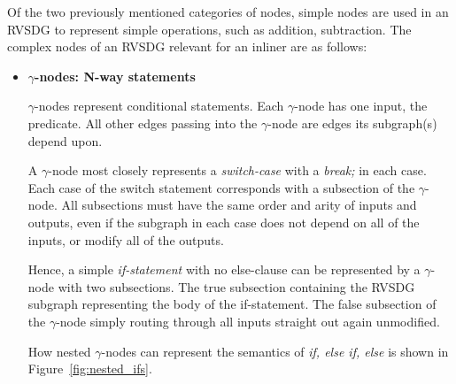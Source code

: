 Of the two previously mentioned categories of nodes, simple nodes are used in an
RVSDG to represent simple operations, such as addition, subtraction. The complex
nodes of an RVSDG relevant for an inliner are as follows:

\begin{itemize}

\item \textbf{$\gamma$-nodes: N-way statements}

\textit{$\gamma$}-nodes represent conditional statements. Each $\gamma$-node has
one input, the predicate. All other edges passing into the $\gamma$-node are
edges its subgraph(s) depend upon.

A $\gamma$-node most closely represents a \textit{switch-case} with a \textit{break;} in
each case. Each case of the switch statement corresponds with a subsection of
the $\gamma$-node. All subsections must have the same order and arity of inputs
and outputs, even if the subgraph in each case does not depend on all of the
inputs, or modify all of the outputs.

Hence, a simple \textit{if-statement} with no else-clause can be represented by
a $\gamma$-node with two subsections. The true subsection containing the RVSDG
subgraph representing the body of the if-statement. The false subsection of the
$\gamma$-node simply routing through all inputs straight out again unmodified.

How nested $\gamma$-nodes can represent the semantics of \textit{if, else if,
else} is shown in Figure~\ref{fig:nested_ifs}.


\end{itemize}

